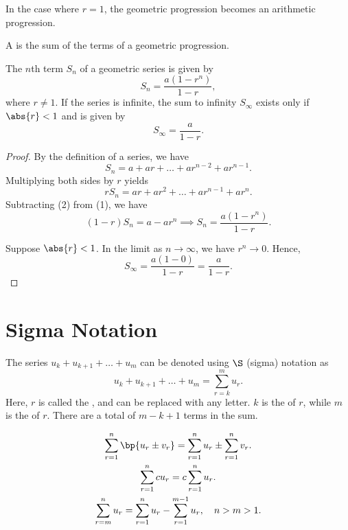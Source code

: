 \begin{remark}
    In the case where $r = 1$, the geometric progression becomes an arithmetic progression.
\end{remark}

\begin{definition}
    A  is the sum of the terms of a geometric progression.
\end{definition}

\begin{proposition}
    The $n$th term $S_n$ of a geometric series is given by \[S_n = \frac{a(1 - r^n)}{1 - r},\] where $r \neq 1$. If the series is infinite, the sum to infinity $S_\infty$ exists only if $\abs{r} < 1$ and is given by \[S_\infty = \frac{a}{1 - r}.\]
\end{proposition}
\begin{proof}
    By the definition of a series, we have \[S_n = a + ar + \dots + ar^{n-2} + ar^{n-1}. \tag{1}\] Multiplying both sides by $r$ yields \[r S_n = ar + ar^2 + \dots + ar^{n-1} + ar^{n}. \tag{2}\] Subtracting (2) from (1), we have \[(1-r)S_n = a - ar^{n} \implies S_n = \frac{a(1 - r^{n})}{1 - r}.\]
    
    Suppose $\abs{r} < 1$. In the limit as $n \to \infty$, we have $r^n \to 0$. Hence, \[S_\infty = \frac{a(1 - 0)}{1 - r} = \frac{a}{1-r}.\]
\end{proof}

\section{Sigma Notation}

\begin{definition}
    The series $u_k + u_{k+1} + \dots + u_m$ can be denoted using $\S$ (sigma) notation as \[u_k + u_{k+1} + \dots + u_m = \sum_{r=k}^m u_r.\] Here, $r$ is called the , and can be replaced with any letter. $k$ is the  of $r$, while $m$ is the  of $r$. There are a total of $m - k + 1$ terms in the sum.
\end{definition}

\begin{fact}
    \begin{gather*}
        \sum_{r = 1}^n \bp{u_r \pm v_r} = \sum_{r = 1}^n u_r \pm \sum_{r = 1}^n v_r.\\
        \sum_{r = 1}^n cu_r = c\sum_{r = 1}^n u_r.\\
        \sum_{r = m}^n u_r = \sum_{r = 1}^n u_r - \sum_{r = 1}^{m-1} u_r, \quad n > m > 1.
    \end{gather*}
\end{fact}

